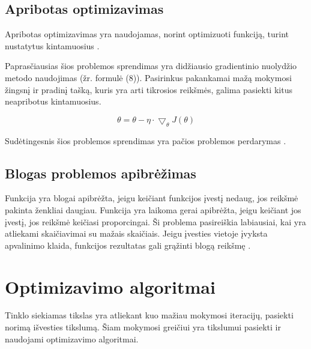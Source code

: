 \documentclass{VUMIFInfKursinis}
\begin{document}
\subsection{Apribotas optimizavimas}
Apribotas optimizavimas yra naudojamas, norint optimizuoti funkciją,
turint nustatytus kintamuosius \cite{salt7}.
\par
Paprasčiausias šios problemos sprendimas yra didžiausio gradientinio nuolydžio
metodo naudojimas (žr. formulė (8)). Pasirinkus pakankamai mažą mokymosi žingsnį ir pradinį tašką, kuris
yra arti tikrosios reikšmės, galima pasiekti kitus neapribotus kintamuosius.

\begin{equation}
\theta = \theta - \eta \cdot \bigtriangledown_{\theta}J(\theta)
\end{equation}

\par
Sudėtingesnis šios problemos sprendimas yra pačios problemos perdarymas \cite{salt7}.

\subsection{Blogas problemos apibrėžimas}

Funkcija yra blogai apibrėžta, jeigu keičiant funkcijos įvestį nedaug, jos reikšmė
pakinta ženkliai daugiau. Funkcija yra laikoma gerai apibrėžta, jeigu keičiant jos įvestį,
jos reikšmė keičiasi proporcingai. Ši problema pasireiškia labiausiai, kai yra
atliekami skaičiavimai su mažais skaičiais. Jeigu įvesties vietoje įvyksta apvalinimo
klaida, funkcijos rezultatas gali grąžinti blogą reikšmę \cite{salt7}.









\section{Optimizavimo algoritmai}
\par
Tinklo siekiamas tikslas yra atliekant kuo mažiau mokymosi iteracijų, pasiekti norimą
išvesties tikslumą. Šiam mokymosi greičiui yra tikslumui pasiekti ir naudojami
optimizavimo algoritmai.
\end{document}
